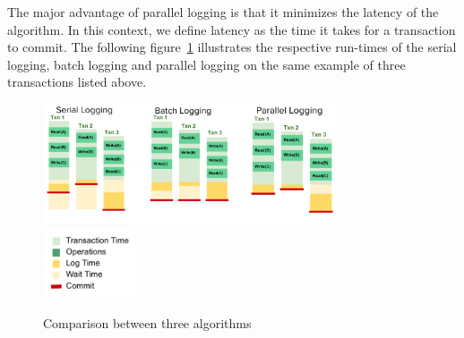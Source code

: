The major advantage of parallel logging is that it minimizes the latency of the algorithm. In this context, we define latency as the time it takes for a transaction to commit. The following figure~\ref{comp} illustrates the respective run-times of the serial logging, batch logging and parallel logging on the same example of three transactions listed above. 
\begin{figure}[!h]
\caption{Comparison between three algorithms}
\centering
\includegraphics[height=100pt]{serial-batch-parallel.png}
\hspace{20pt}
\includegraphics[height=60pt]{leg.png}
\label{comp}
\end{figure}